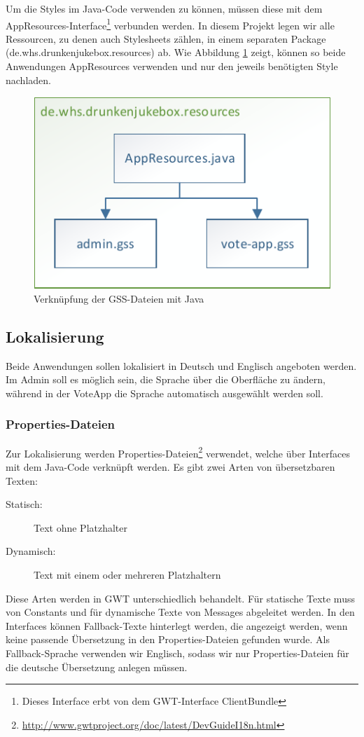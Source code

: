 Um die Styles im Java-Code verwenden zu können, müssen diese mit dem AppResources-Interface\footnote{Dieses Interface erbt von dem GWT-Interface ClientBundle} verbunden werden.
In diesem Projekt legen wir alle Ressourcen, zu denen auch Stylesheets zählen, in
einem separaten Package (de.whs.drunkenjukebox.resources) ab. Wie Abbildung
\ref{fig:GSS} zeigt, können so beide Anwendungen AppResources verwenden
und nur den jeweils benötigten Style nachladen.

\begin{figure}[tbh]
\centering
\includegraphics[width=0.5\linewidth]{Bilder/GSS}
\caption{Verknüpfung der GSS-Dateien mit Java}
\label{fig:GSS}
\end{figure}


\subsection{Lokalisierung}
Beide Anwendungen sollen lokalisiert in Deutsch und Englisch angeboten werden.
Im Admin soll es möglich sein, die Sprache über die Oberfläche zu ändern, während
in der VoteApp die Sprache automatisch ausgewählt werden soll.

\subsubsection{Properties-Dateien}

Zur Lokalisierung werden Properties-Dateien\footnote{\url{http://www.gwtproject.org/doc/latest/DevGuideI18n.html}} verwendet, welche über Interfaces
mit dem Java-Code verknüpft werden. Es gibt zwei Arten von übersetzbaren Texten:
\begin{description}
	\item[Statisch:] Text ohne Platzhalter
	\item[Dynamisch:] Text mit einem oder mehreren Platzhaltern
\end{description}
Diese Arten werden in GWT unterschiedlich behandelt. Für statische Texte muss
von Constants und für dynamische Texte von Messages abgeleitet werden. In den Interfaces können Fallback-Texte hinterlegt werden, die angezeigt werden, wenn keine passende Übersetzung in den Properties-Dateien gefunden wurde. Als
Fallback-Sprache verwenden wir Englisch, sodass wir nur Properties-Dateien für
die deutsche Übersetzung anlegen müssen.

